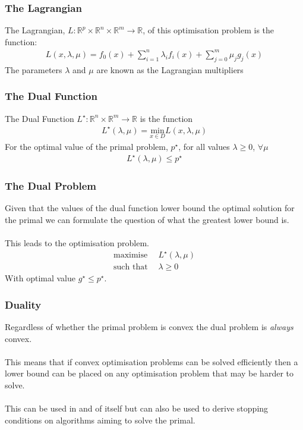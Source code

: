 \documentclass{beamer}
\def\rnum{\mathbb{R}}
\begin{document}
\begin{frame}
    \frametitle{The Lagrangian}
    The Lagrangian, $L : \rnum^{p} \times \rnum^{n} \times \rnum^{m} \rightarrow
    \rnum$, of this optimisation problem is the function:
    \begin{align*}
        L(x, \lambda, \mu) = f_{0}(x) + \sum\limits_{i=1}^{n}\lambda_{i} f_{i}(x) +
        \sum\limits_{j=0}^{m}\mu_{j}g_{j}(x)
    \end{align*}
    The parameters $\lambda$ and $\mu$ are known as the Lagrangian multipliers
\end{frame}

\begin{frame}
    \frametitle{The Dual Function}
    The Dual Function $L^{\star}: \rnum^{n}\times\rnum^{m} \rightarrow \rnum$ is
    the function
    \begin{align*}
        L^{\star}(\lambda, \mu) = \underset{x \in D}{\text{min}}L(x, \lambda, \mu)
    \end{align*}
    For the optimal value of the primal problem, $p^{\star}$, for all values
    $\lambda \geq 0$, $\forall \mu$
    \begin{align*}
        L^{\star}(\lambda, \mu) \leq p^{\star}
    \end{align*}
\end{frame}

\begin{frame}
    \frametitle{The Dual Problem}
    Given that the values of the dual function lower bound the optimal solution
    for the primal we can formulate the question of what the greatest lower
    bound is.
    \\~\\
    This leads to the optimisation problem.
    {\footnotesize
    \begin{align*}
        \text{maximise } \, &L^{\star}(\lambda, \mu)\\
        \text{such that } &\lambda \geq 0
    \end{align*}}
    With optimal value $g^{\star} \leq p^{\star}$.
\end{frame}

\begin{frame}
    \frametitle{Duality}
    Regardless of whether the primal problem is convex the dual problem is
    \textit{always} convex.
    \\~\\
    This means that if convex optimisation problems can be solved efficiently
    then a lower bound can be placed on any optimisation problem that may be
    harder to solve.
    \\~\\
    This can be used in and of itself but can also be used to derive stopping
    conditions on algorithms aiming to solve the primal.
\end{frame}
\end{document}
